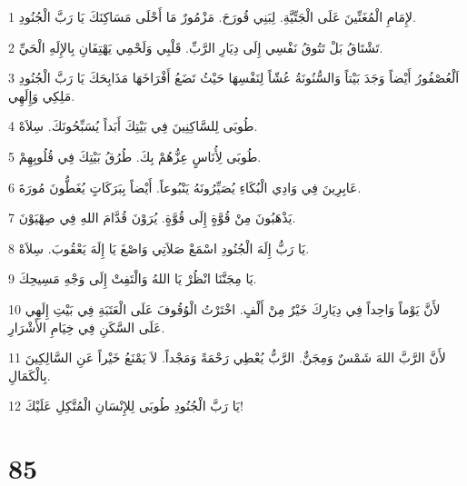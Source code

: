\par 1 لإِمَامِ الْمُغَنِّينَ عَلَى الْجَتِّيَّةِ. لِبَنِي قُورَحَ. مَزْمُورٌ مَا أَحْلَى مَسَاكِنَكَ يَا رَبَّ الْجُنُودِ.
\par 2 تَشْتَاقُ بَلْ تَتُوقُ نَفْسِي إِلَى دِيَارِ الرَّبِّ. قَلْبِي وَلَحْمِي يَهْتِفَانِ بِالإِلَهِ الْحَيِّ.
\par 3 اَلْعُصْفُورُ أَيْضاً وَجَدَ بَيْتاً وَالسُّنُونَةُ عُشّاً لِنَفْسِهَا حَيْثُ تَضَعُ أَفْرَاخَهَا مَذَابِحَكَ يَا رَبَّ الْجُنُودِ مَلِكِي وَإِلَهِي.
\par 4 طُوبَى لِلسَّاكِنِينَ فِي بَيْتِكَ أَبَداً يُسَبِّحُونَكَ. سِلاَهْ.
\par 5 طُوبَى لِأُنَاسٍ عِزُّهُمْ بِكَ. طُرُقُ بَيْتِكَ فِي قُلُوبِهِمْ.
\par 6 عَابِرِينَ فِي وَادِي الْبُكَاءِ يُصَيِّرُونَهُ يَنْبُوعاً. أَيْضاً بِبَرَكَاتٍ يُغَطُّونَ مُورَةَ.
\par 7 يَذْهَبُونَ مِنْ قُوَّةٍ إِلَى قُوَّةٍ. يُرَوْنَ قُدَّامَ اللهِ فِي صِهْيَوْنَ.
\par 8 يَا رَبُّ إِلَهَ الْجُنُودِ اسْمَعْ صَلاَتِي وَاصْغَ يَا إِلَهَ يَعْقُوبَ. سِلاَهْ.
\par 9 يَا مِجَنَّنَا انْظُرْ يَا اللهُ وَالْتَفِتْ إِلَى وَجْهِ مَسِيحِكَ.
\par 10 لأَنَّ يَوْماً وَاحِداً فِي دِيَارِكَ خَيْرٌ مِنْ أَلْفٍ. اخْتَرْتُ الْوُقُوفَ عَلَى الْعَتَبَةِ فِي بَيْتِ إِلَهِي عَلَى السَّكَنِ فِي خِيَامِ الأَشْرَارِ.
\par 11 لأَنَّ الرَّبَّ اللهَ شَمْسٌ وَمِجَنٌّ. الرَّبُّ يُعْطِي رَحْمَةً وَمَجْداً. لاَ يَمْنَعُ خَيْراً عَنِ السَّالِكِينَ بِالْكَمَالِ.
\par 12 يَا رَبَّ الْجُنُودِ طُوبَى لِلإِنْسَانِ الْمُتَّكِلِ عَلَيْكَ!

\chapter{85}

